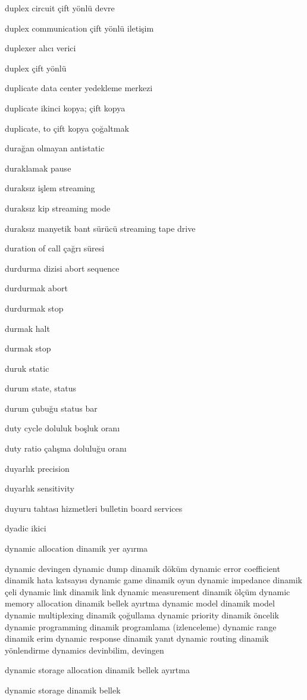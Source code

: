 \documentclass[12pt,fleqn]{article}\usepackage{../../common}
\begin{document}
duplex circuit çift yönlü devre

duplex communication çift yönlü iletişim

duplexer alıcı verici

duplex çift yönlü

duplicate data center yedekleme merkezi

duplicate ikinci kopya; çift kopya

duplicate, to çift kopya çoğaltmak

durağan olmayan antistatic

duraklamak pause

duraksız işlem streaming

duraksız kip streaming mode

duraksız manyetik bant sürücü streaming tape drive

duration of call çağrı süresi

durdurma dizisi abort sequence

durdurmak abort

durdurmak stop

durmak halt

durmak stop

duruk static

durum state, status

durum çubuğu status bar

duty cycle doluluk boşluk oranı

duty ratio çalışma doluluğu oranı

duyarlık precision

duyarlık sensitivity

duyuru tahtası hizmetleri bulletin board services

dyadic ikici

dynamic allocation dinamik yer ayırma

dynamic devingen
dynamic dump dinamik döküm
dynamic error coefficient dinamik hata katsayısı
dynamic game dinamik oyun
dynamic impedance dinamik çeli
dynamic link dinamik link
dynamic measurement dinamik ölçüm
dynamic memory allocation dinamik bellek ayırtma
dynamic model dinamik model
dynamic multiplexing dinamik çoğullama
dynamic priority dinamik öncelik
dynamic programming dinamik programlama (izlenceleme)
dynamic range dinamik erim
dynamic response dinamik yanıt
dynamic routing dinamik yönlendirme
dynamics devinbilim, devingen

dynamic storage allocation dinamik bellek ayırtma

dynamic storage dinamik bellek
\end{document}
